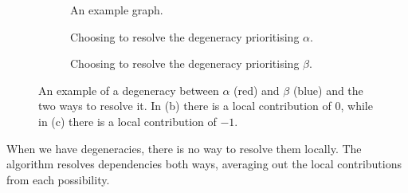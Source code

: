 \documentclass[12pt]{report}
\theoremstyle{upright}
\begin{document}
\begin{figure}[h]
	\centering
	\hspace*{\fill}
	\begin{subfigure}[b]{0.4 \textwidth}
	\centering
	\def\svgscale{0.7}
	
	\caption{An example graph.}
	\label{fig:int-num-graph}
	\end{subfigure}
	\hspace*{\fill}
	\begin{subfigure}[b]{0.25 \textwidth}
		\centering
		\def\svgscale{0.6}
		
		\caption{Choosing to resolve the degeneracy prioritising $\alpha$.}
		\label{fig:res-int-num-red}
	\end{subfigure}
	\hspace*{\fill}
	\begin{subfigure}[b]{0.25 \textwidth}
		\centering
		\def\svgscale{0.6}
		
		\caption{Choosing to resolve the degeneracy prioritising $\beta$.}
		\label{fig:res-int-num-blue}
	\end{subfigure}
	\hspace*{\fill} 
	\caption{An example of a degeneracy between $\alpha$ (red) and $\beta$ (blue) and the two ways to resolve it. In (b) there is a local contribution of $0$, while in (c) there is a local contribution of $-1$.}
	\label{fig:intersection-number-graph}
\end{figure}

When we have degeneracies, there is no way to resolve them locally. The algorithm resolves dependencies both ways, averaging out the local contributions from each possibility.
\end{document}
